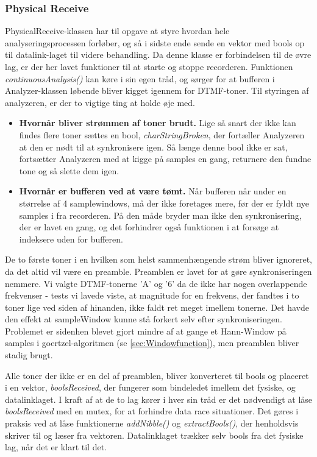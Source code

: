 \subsubsection{Physical Receive}

PhysicalReceive-klassen har til opgave at styre hvordan hele analyseringsprocessen forløber, og så i sidste ende sende en vektor med bools op til datalink-laget til videre behandling. Da denne klasse er forbindelsen til de øvre lag, er der her lavet funktioner til at starte og stoppe recorderen. Funktionen \textit{continuousAnalysis()} kan køre i sin egen tråd, og sørger for at bufferen i Analyzer-klassen løbende bliver kigget igennem for DTMF-toner. Til styringen af analyzeren, er der to vigtige ting at holde øje med.

\begin{itemize}

\item \textbf{Hvornår bliver strømmen af toner brudt.} Lige så snart der ikke kan findes flere toner sættes en bool, \textit{charStringBroken}, der fortæller Analyzeren at den er nødt til at synkronisere igen. Så længe denne bool ikke er sat, fortsætter Analyzeren med at kigge på samples en gang, returnere den fundne tone og så slette dem igen. 
\item \textbf{Hvornår er bufferen ved at være tømt.} Når bufferen når under en størrelse af 4 samplewindows, må der ikke foretages mere, før der er fyldt nye samples i fra recorderen. På den måde bryder man ikke den synkronisering, der er lavet en gang, og det forhindrer også funktionen i at forsøge at indeksere uden for bufferen.
\end{itemize}

De to første toner i en hvilken som helst sammenhængende strøm bliver ignoreret, da det altid vil være en preamble. Preamblen er lavet for at gøre synkroniseringen nemmere. Vi valgte DTMF-tonerne 'A' og '6' da de ikke har nogen overlappende frekvenser - tests vi lavede viste, at magnitude for en frekvens, der fandtes i to toner lige ved siden af hinanden, ikke faldt ret meget imellem tonerne. Det havde den effekt at sampleWindow kunne stå forkert selv efter synkroniseringen. Problemet er sidenhen blevet gjort mindre af at gange et Hann-Window på samples i goertzel-algoritmen (se \ref{sec:Windowfunction}), men preamblen bliver stadig brugt. 


Alle toner der ikke er en del af preamblen, bliver konverteret til bools og placeret i en vektor, \textit{boolsReceived}, der fungerer som bindeledet imellem det fysiske, og datalinklaget. I kraft af at de to lag kører i hver sin tråd er det nødvendigt at låse \textit{boolsReceived} med en mutex, for at forhindre data race situationer. Det gøres i praksis ved at låse funktionerne \textit{addNibble()} og \textit{extractBools()}, der henholdsvis skriver til og læser fra vektoren. Datalinklaget trækker selv bools fra det fysiske lag, når det er klart til det.\\